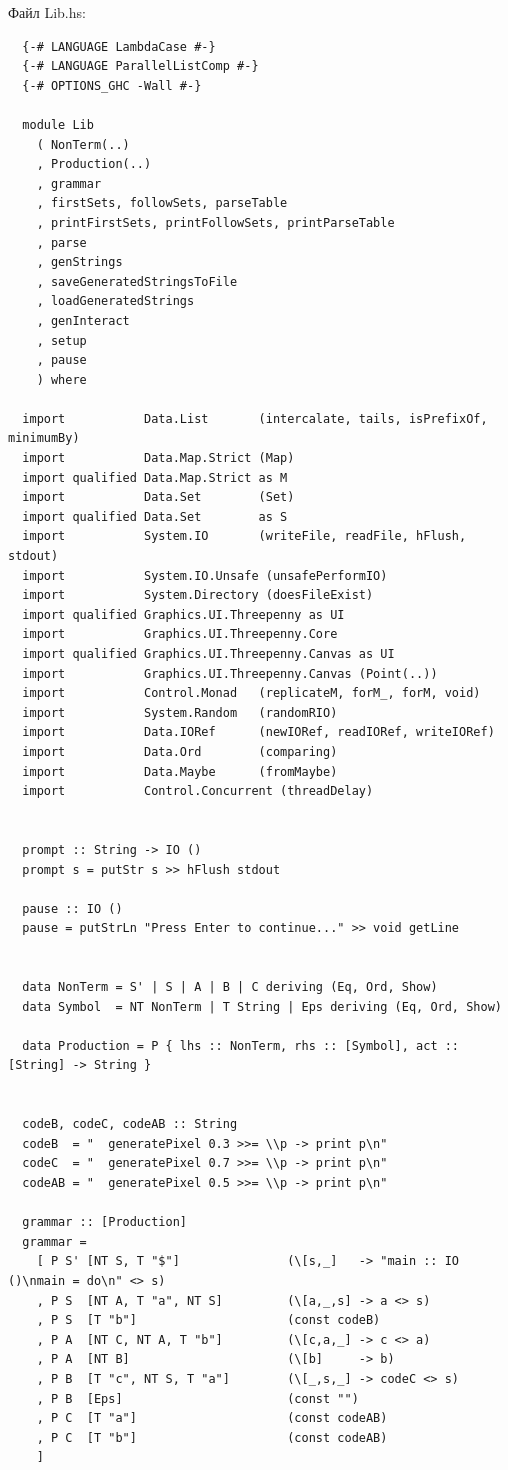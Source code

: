 \documentclass[areasetadvanced]{scrartcl}
\begin{document}
Файл Lib.hs:
\begin{lstlisting}
  {-# LANGUAGE LambdaCase #-}
  {-# LANGUAGE ParallelListComp #-}
  {-# OPTIONS_GHC -Wall #-}
  
  module Lib
    ( NonTerm(..)
    , Production(..)
    , grammar
    , firstSets, followSets, parseTable
    , printFirstSets, printFollowSets, printParseTable
    , parse                     
    , genStrings
    , saveGeneratedStringsToFile
    , loadGeneratedStrings
    , genInteract
    , setup                     
    , pause
    ) where
  
  import           Data.List       (intercalate, tails, isPrefixOf, minimumBy)
  import           Data.Map.Strict (Map)
  import qualified Data.Map.Strict as M
  import           Data.Set        (Set)
  import qualified Data.Set        as S
  import           System.IO       (writeFile, readFile, hFlush, stdout)
  import           System.IO.Unsafe (unsafePerformIO)
  import           System.Directory (doesFileExist)
  import qualified Graphics.UI.Threepenny as UI
  import           Graphics.UI.Threepenny.Core
  import qualified Graphics.UI.Threepenny.Canvas as UI
  import           Graphics.UI.Threepenny.Canvas (Point(..))
  import           Control.Monad   (replicateM, forM_, forM, void)
  import           System.Random   (randomRIO)
  import           Data.IORef      (newIORef, readIORef, writeIORef)
  import           Data.Ord        (comparing)
  import           Data.Maybe      (fromMaybe)
  import           Control.Concurrent (threadDelay)
  
  
  prompt :: String -> IO ()
  prompt s = putStr s >> hFlush stdout
  
  pause :: IO ()
  pause = putStrLn "Press Enter to continue..." >> void getLine
  
  
  data NonTerm = S' | S | A | B | C deriving (Eq, Ord, Show)
  data Symbol  = NT NonTerm | T String | Eps deriving (Eq, Ord, Show)
  
  data Production = P { lhs :: NonTerm, rhs :: [Symbol], act :: [String] -> String }
  
  
  codeB, codeC, codeAB :: String
  codeB  = "  generatePixel 0.3 >>= \\p -> print p\n"
  codeC  = "  generatePixel 0.7 >>= \\p -> print p\n"
  codeAB = "  generatePixel 0.5 >>= \\p -> print p\n"
  
  grammar :: [Production]
  grammar =
    [ P S' [NT S, T "$"]               (\[s,_]   -> "main :: IO ()\nmain = do\n" <> s)
    , P S  [NT A, T "a", NT S]         (\[a,_,s] -> a <> s)
    , P S  [T "b"]                     (const codeB)
    , P A  [NT C, NT A, T "b"]         (\[c,a,_] -> c <> a)
    , P A  [NT B]                      (\[b]     -> b)
    , P B  [T "c", NT S, T "a"]        (\[_,s,_] -> codeC <> s)
    , P B  [Eps]                       (const "")
    , P C  [T "a"]                     (const codeAB)
    , P C  [T "b"]                     (const codeAB)
    ]
  

\end{lstlisting}
\end{document}
